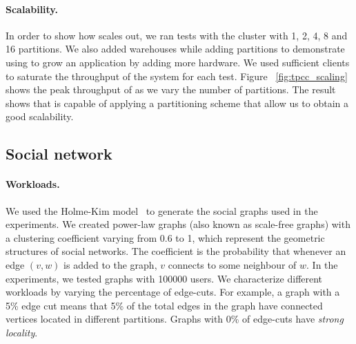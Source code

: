 \paragraph*{Scalability.}
In order to show how \dynastar scales out, we ran tests with the cluster with 1, 2, 4, 8 
and 16 partitions. We also added warehouses while adding partitions to demonstrate using 
\dynastar to grow an application by adding more hardware. We used sufficient clients to 
saturate the throughput of the system for each test. 
Figure ~\ref{fig:tpcc_scaling} shows the peak throughput of \dynastar as we vary the 
number of partitions. The result shows that \dynastar is capable of applying
a partitioning scheme that allow us to obtain a good scalability.


\subsection{Social network}

\paragraph*{Workloads.}
We used the Holme-Kim model~\cite{holme-kim} to generate the social 
graphs used in the experiments. We created power-law graphs (also
known as scale-free graphs) with a clustering coefficient varying from
0.6 to 1, which represent the geometric structures of social
networks. The coefficient is the probability that whenever an edge
$(v, w)$ is added to the graph, $v$ connects to some neighbour of $w$.
In the experiments, we tested graphs with 100000 users. We characterize
different workloads by varying the percentage of edge-cuts.  For
example, a graph with a 5\% edge cut means that 5\% of the total edges
in the graph have connected vertices located in different partitions.
Graphs with 0\% of edge-cuts have \emph{strong locality}.



